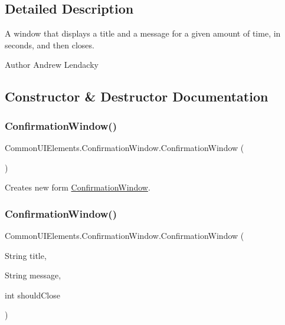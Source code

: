 \subsection{Detailed Description}
A window that displays a title and a message for a given amount of time, in seconds, and then closes. 

\begin{DoxyAuthor}{Author}
Andrew Lendacky 
\end{DoxyAuthor}


\subsection{Constructor \& Destructor Documentation}
\mbox{\label{classCommonUIElements_1_1ConfirmationWindow_ae99ae36a3b34af52c80bfe2d404788c5}} 
\subsubsection{\texorpdfstring{Confirmation\+Window()}{ConfirmationWindow()}\hspace{0.1cm}{\footnotesize\ttfamily [1/2]}}
{\footnotesize\ttfamily Common\+U\+I\+Elements.\+Confirmation\+Window.\+Confirmation\+Window (\begin{DoxyParamCaption}{ }\end{DoxyParamCaption})}



Creates new form \hyperlink{classCommonUIElements_1_1ConfirmationWindow}{Confirmation\+Window}. 

\mbox{\label{classCommonUIElements_1_1ConfirmationWindow_af0187cf6484465c088b4b1d49a345027}} 
\subsubsection{\texorpdfstring{Confirmation\+Window()}{ConfirmationWindow()}\hspace{0.1cm}{\footnotesize\ttfamily [2/2]}}
{\footnotesize\ttfamily Common\+U\+I\+Elements.\+Confirmation\+Window.\+Confirmation\+Window (\begin{DoxyParamCaption}\item[{String}]{title,  }\item[{String}]{message,  }\item[{int}]{should\+Close }\end{DoxyParamCaption})}



